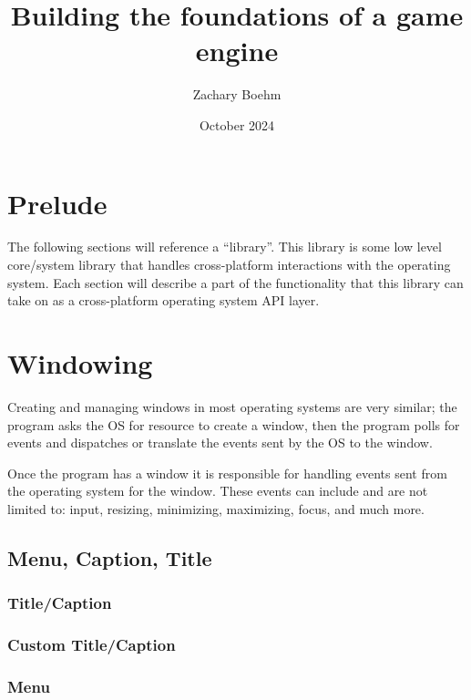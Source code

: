 \documentclass[11pt, letterpaper]{article}
\title{Building the foundations of a game engine}
\author{Zachary Boehm}
\date{October 2024}
\begin{document}
\maketitle

\break

\tableofcontents

\break


\section{Prelude}

The following sections will reference a ``library''. This library is some low level core/system library that handles cross-platform interactions with the operating system. Each section will describe a part of the functionality that this library can take on as a cross-platform operating system API layer.

\section{Windowing}

Creating and managing windows in most operating systems are very similar; the program asks the OS for resource to create a window, then the program polls for events and dispatches or translate the events sent by the OS to the window.

Once the program has a window it is responsible for handling events sent from the operating system for the window. These events can include and are not limited to: input, resizing, minimizing, maximizing, focus, and much more.

\subsection{Menu, Caption, Title}
\blindtext
\subsubsection{Title/Caption}
\blindtext
\subsubsection{Custom Title/Caption}
\blindtext
\subsubsection{Menu}
\blindtext
\end{document}
